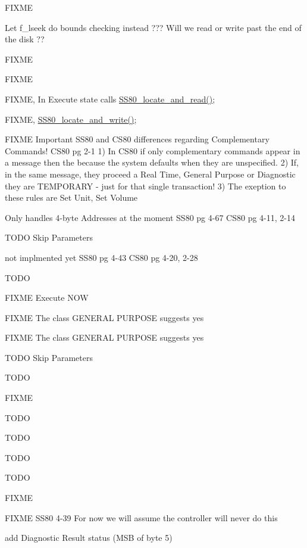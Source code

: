 \begin{DoxyRefList}
F\+I\+X\+ME  
\item[\label{todo__todo000058}%
\hypertarget{todo__todo000058}{}%
Global \hyperlink{ss80_8h_a0d2e3b28c642ea89fea6ff6f8ced5a3b}{S\+S80\+\_\+cmd\+\_\+seek} (void)]Let f\+\_\+lseek do bounds checking instead ??? Will we read or write past the end of the disk ??  
\item[\label{todo__todo000030}%
\hypertarget{todo__todo000030}{}%
Global \hyperlink{ss80_8h_a98c1da720b6dbe5ee9f13b914a913e17}{S\+S80\+\_\+\+Command\+\_\+\+State} (void)]F\+I\+X\+ME 

F\+I\+X\+ME 

F\+I\+X\+ME, In Execute state calls \hyperlink{ss80_8c_acad6de863f4566b55cb8860eb1ffd09c}{S\+S80\+\_\+locate\+\_\+and\+\_\+read()}; 

F\+I\+X\+ME, \hyperlink{ss80_8c_a41ef37ec5419463815401485cfcb62b1}{S\+S80\+\_\+locate\+\_\+and\+\_\+write()}; 

F\+I\+X\+ME Important S\+S80 and C\+S80 differences regarding Complementary Commands! C\+S80 pg 2-\/1 1) In C\+S80 if only complementary commands appear in a message then the because the system defaults when they are unspecified. 2) If, in the same message, they proceed a Real Time, General Purpose or Diagnostic they are T\+E\+M\+P\+O\+R\+A\+RY -\/ just for that single transaction! 3) The exeption to these rules are Set Unit, Set Volume 

Only handles 4-\/byte Addresses at the moment S\+S80 pg 4-\/67 C\+S80 pg 4-\/11, 2-\/14 

T\+O\+DO Skip Parameters 

not implmented yet S\+S80 pg 4-\/43 C\+S80 pg 4-\/20, 2-\/28 

T\+O\+DO 

F\+I\+X\+ME Execute N\+OW 

F\+I\+X\+ME The class G\+E\+N\+E\+R\+AL P\+U\+R\+P\+O\+SE suggests yes 

F\+I\+X\+ME The class G\+E\+N\+E\+R\+AL P\+U\+R\+P\+O\+SE suggests yes 

T\+O\+DO Skip Parameters 

T\+O\+DO 

F\+I\+X\+ME 

T\+O\+DO 

T\+O\+DO 

T\+O\+DO 

T\+O\+DO  
\item[\label{todo__todo000026}%
\hypertarget{todo__todo000026}{}%
Global \hyperlink{ss80_8h_a46587aecd8aff545fb96ef5b308f28ff}{S\+S80\+\_\+init} (void)]F\+I\+X\+ME  
\item[\label{todo__todo000027}%
\hypertarget{todo__todo000027}{}%
Global \hyperlink{ss80_8h_acad6de863f4566b55cb8860eb1ffd09c}{S\+S80\+\_\+locate\+\_\+and\+\_\+read} (void)]F\+I\+X\+ME S\+S80 4-\/39 For now we will assume the controller will never do this  
\item[\label{todo__todo000028}%
\hypertarget{todo__todo000028}{}%
Global \hyperlink{ss80_8h_ac4c1287b3b8b6a51f5b79522c62d4cea}{S\+S80\+\_\+send\+\_\+status} (void)]add Diagnostic Result status (M\+SB of byte 5) 


\end{DoxyRefList}
